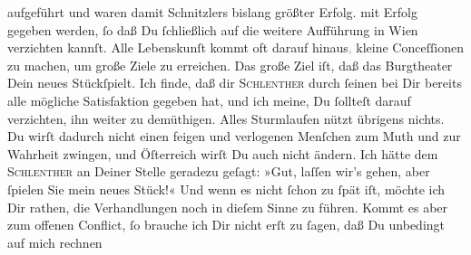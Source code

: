 {{{                  aufgeführt und waren damit Schnitzlers bislang größter Erfolg.}}}\label{K_L02893-3}{ }{\pb}mit Erfolg gegeben werden,{ }ſo daß Du{ }ſchließlich
               auf die weitere Aufführung in Wien verzichten
               kannſt. Alle Lebenskunſt kommt oft darauf hinaus\textcolor{gray}{,} kleine
               Conceſſionen zu machen, um große Ziele zu erreichen. Das große Ziel iſt, daß das Burgtheater Dein neues Stückſpielt. Ich finde, daß dir \textsc{Schlenther} durch{ }ſeinen \label{K_L02893-4v}\label{K_L02893-4} bei Dir bereits alle mögliche Satisfaktion gegeben hat, und ich meine, Du{ }ſollteſt darauf verzichten, ihn weiter zu demüthigen. Alles Sturmlaufen \strikeout{\textcolor{gray}{nu}} nützt übrigens nichts. Du wirſt dadurch nicht einen feigen und verlogenen
               Menſchen zum Muth und zur Wahrheit  zwingen, und Öſterreich wirſt Du auch
               nicht ändern. Ich hätte dem \textsc{Schlenther} an Deiner Stelle geradezu geſagt: »Gut, laſſen wir’s gehen, aber{ }ſpielen Sie
               mein neues Stück!« Und {\pb}wenn es nicht{ }ſchon zu{ }ſpät iſt, möchte ich Dir
               rathen, die Verhandlungen noch in dieſem Sinne zu führen. Kommt es aber zum offenen
               Conflict,{ }ſo brauche ich Dir nicht erſt zu{ }ſagen, daß Du unbedingt auf mich rechnen
